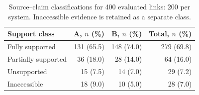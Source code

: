 \begin{table}[H]
\caption{Source--claim classifications for 400 evaluated links: 200 per system. Inaccessible evidence is retained as a separate class.}\label{tab:support}
\small
\begin{tabularx}{\textwidth}{Y r r r}
\toprule
Support class & A, $n$ (\%) & B, $n$ (\%) & Total, $n$ (\%) \\
\midrule
Fully supported & 131 (65.5) & 148 (74.0) & 279 (69.8) \\
Partially supported & 36 (18.0) & 28 (14.0) & 64 (16.0) \\
Unsupported & 15 (7.5) & 14 (7.0) & 29 (7.2) \\
Inaccessible & 18 (9.0) & 10 (5.0) & 28 (7.0) \\
\bottomrule
\end{tabularx}
\end{table}